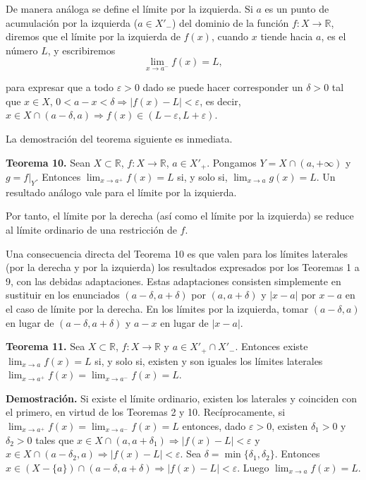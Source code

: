 \documentclass[12pt,oneside]{book}
\begin{document}
De manera análoga se define el límite por la izquierda. Si \( a \) es un punto de acumulación por la izquierda (\( a \in X'_- \)) del dominio de la función \( f: X \to \mathbb{R} \), diremos que el límite por la izquierda de \( f(x) \), cuando \( x \) tiende hacia \( a \), es el número \( L \), y escribiremos
\[
\lim_{x \to a^-} f(x) = L,
\]

para expresar que a todo \( \varepsilon > 0 \) dado se puede hacer corresponder un \( \delta > 0 \) tal que \( x \in X \), \( 0 < a - x < \delta \Rightarrow |f(x) - L| < \varepsilon \), es decir, \( x \in X \cap (a - \delta, a) \Rightarrow f(x) \in (L - \varepsilon, L + \varepsilon) \).

La demostración del teorema siguiente es inmediata.

\textbf{Teorema 10.} Sean \( X \subset \mathbb{R} \), \( f: X \to \mathbb{R} \), \( a \in X'_+ \). Pongamos \( Y = X \cap (a, +\infty) \) y \( g = f|_Y \). Entonces \( \lim_{x \to a^+} f(x) = L \) si, y solo si, \( \lim_{x \to a} g(x) = L \). Un resultado análogo vale para el límite por la izquierda.

Por tanto, el límite por la derecha (así como el límite por la izquierda) se reduce al límite ordinario de una restricción de \( f \).

Una consecuencia directa del Teorema 10 es que valen para los límites laterales (por la derecha y por la izquierda) los resultados expresados por los Teoremas 1 a 9, con las debidas adaptaciones. Estas adaptaciones consisten simplemente en sustituir en los enunciados \( (a - \delta, a + \delta) \) por \( (a, a + \delta) \) y \( |x - a| \) por \( x - a \) en el caso de límite por la derecha. En los límites por la izquierda, tomar \( (a - \delta, a) \) en lugar de \( (a - \delta, a + \delta) \) y \( a - x \) en lugar de \( |x - a| \).

\textbf{Teorema 11.} Sea \( X \subset \mathbb{R} \), \( f: X \to \mathbb{R} \) y \( a \in X'_+ \cap X'_- \). Entonces existe \( \lim_{x \to a} f(x) = L \) si, y solo si, existen y son iguales los límites laterales \( \lim_{x \to a^+} f(x) = \lim_{x \to a^-} f(x) = L \).

\textbf{Demostración.} Si existe el límite ordinario, existen los laterales y coinciden con el primero, en virtud de los Teoremas 2 y 10. Recíprocamente, si \( \lim_{x \to a^+} f(x) = \lim_{x \to a^-} f(x) = L \) entonces, dado \( \varepsilon > 0 \), existen \( \delta_1 > 0 \) y \( \delta_2 > 0 \) tales que \( x \in X \cap (a, a + \delta_1) \Rightarrow |f(x) - L| < \varepsilon \) y \( x \in X \cap (a - \delta_2, a) \Rightarrow |f(x) - L| < \varepsilon \). Sea \( \delta = \min\{\delta_1, \delta_2\} \). Entonces \( x \in (X - \{a\}) \cap (a - \delta, a + \delta) \Rightarrow |f(x) - L| < \varepsilon \). Luego \( \lim_{x \to a} f(x) = L \).
\end{document}
